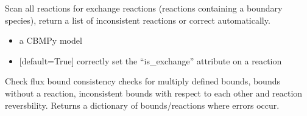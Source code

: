 \documentclass[letterpaper,10pt,english]{sphinxmanual}
\begin{document}

\begin{fulllineitems}
\label{\detokenize{modules_doc:cbmpy.CBTools.checkExchangeReactions}}
\pysigstartsignatures
{}
\pysigstopsignatures
\sphinxAtStartPar
Scan all reactions for exchange reactions (reactions containing a boundary species), return a list of
inconsistent reactions or correct automatically.
\begin{itemize}
\item {} 
\sphinxAtStartPar
{} a CBMPy model

\item {} 
\sphinxAtStartPar
{} {[}default=True{]} correctly set the “is\_exchange” attribute on a reaction

\end{itemize}

\end{fulllineitems}


\begin{fulllineitems}
\label{\detokenize{modules_doc:cbmpy.CBTools.checkFluxBoundConsistency}}
\pysigstartsignatures
{}
\pysigstopsignatures
\sphinxAtStartPar
Check flux bound consistency checks for multiply defined bounds, bounds without a reaction, inconsistent bounds with respect to each other
and reaction reversbility. Returns a dictionary of bounds/reactions where errors occur.

\end{fulllineitems}

\end{document}
